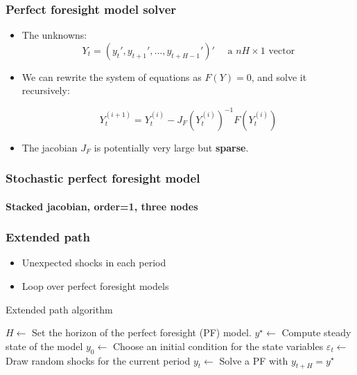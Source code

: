 \documentclass{beamer}
\begin{document}
\begin{frame}
   \frametitle{Perfect foresight model solver}

   \begin{itemize}

      \item The unknowns:\newline
            \[
               Y_t = (y_t', y_{t+1}',\ldots,y_{t+H-1}')' \quad\text{ a }nH\times 1\text{ vector}
            \]

            \bigskip

      \item We can rewrite the system of equations as $F(Y)=0$, and solve it recursively:\newline

            \[
               Y_t^{(i+1)} = Y_t^{(i)} - J_F\left(Y_t^{(i)}\right)^{-1} F\left(Y_t^{(i)}\right)
            \]
            \medskip

      \item The jacobian $J_F$ is potentially very large but \textbf{sparse}.

   \end{itemize}

\end{frame}


\begin{frame}
   \frametitle{Stochastic perfect foresight model}
   \framesubtitle{Stacked jacobian, order=1, three nodes}
   \begin{center}
      \scalebox{.5}{
         }
   \end{center}
\end{frame}


\begin{frame}
   \frametitle{Extended path}

   \begin{itemize}
      \item Unexpected shocks in each period\newline
      \item Loop over perfect foresight models\newline
   \end{itemize}

   \medskip

   \begin{algorithm}[H]
      \caption{Extended path algorithm}
      \label{alg:ep}
      \begin{algorithmic}[1]
         \STATE $H \leftarrow$ Set the horizon of the perfect foresight (PF) model.
         \STATE $y^\star \leftarrow$ Compute steady state of the model
         \STATE $y_{0} \leftarrow$ Choose an initial condition for the state variables
         \STATE $\varepsilon_t  \leftarrow$ Draw random shocks for the current period
         \STATE $y_t \leftarrow$ Solve a PF with $y_{t+H}=y^{\star}$
         \ENDFOR
      \end{algorithmic}
   \end{algorithm}

\end{frame}
\end{document}

